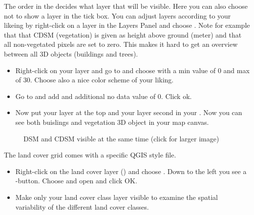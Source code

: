 \documentclass[letterpaper,10pt,english]{sphinxmanual}
\let\sphinxpxdimen\pdfpxdimen\else\newdimen\sphinxpxdimen
\begin{document}
The order in the  decides what layer that will be visible. Here you can also choose not to show a layer in the tick box. You can adjust layers according to your likeing by right-click on a layer in the Layers Panel and choose . Note for example that that CDSM (vegetation) is given as height above ground (meter) and that all non-vegetated pixels are set to zero. This makes it hard to get an overview between all 3D objects (buildings and trees).
\begin{itemize}
\item {} 
Right-click on your  layer and go to  and choose  with a min value of 0 and max of 30. Choose also a nice color scheme of your liking.

\item {} 
Go to  and  add and additional no data value of 0. Click ok.

\item {} 
Now put your  layer at the top and your  layer second in your . Now you can see both buislings and vegetation 3D object in your map canvas.

\end{itemize}

\begin{figure}[htbp]
\centering
\capstart

\noindent\sphinxincludegraphics[width=1073\sphinxpxdimen]{{SUEWSSpatial_dataview}.png}
\caption{DSM and CDSM visible at the same time (click for larger image)}\label{\detokenize{Tutorials/SuewsWUDAPT:id3}}\end{figure}

The land cover grid comes with a specific QGIS style file.
\begin{itemize}
\item {} 
Right-click on the land cover layer () and choose . Down to the left you see a -button. Choose  and open  and click OK.

\item {} 
Make only your land cover class layer visible to examine the spatial variability of the different land cover classes.

\end{itemize}
\end{document}
